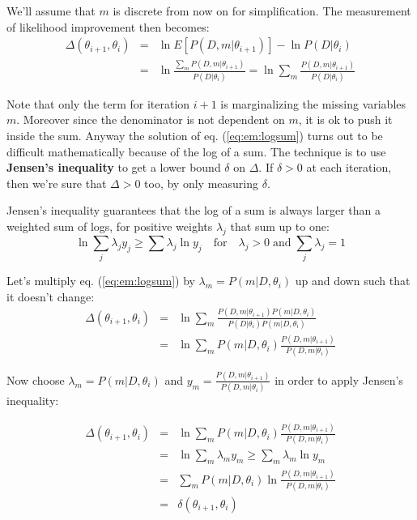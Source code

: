 We'll assume that $m$ is discrete from now on for simplification. 
The measurement of likelihood improvement then becomes:
\begin{eqnarray}
\Delta(\theta_{i+1}, \theta_i) & = &
\ln E[P(D,m|\theta_{i+1})] - \ln P(D|\theta_i) \\ & = &
\ln \frac{\sum_m P(D,m|\theta_{i+1})}{ P(D|\theta_i) } =
\ln \sum_m \frac{P(D,m|\theta_{i+1})}{ P(D|\theta_i) }
\label{eq:em:logsum}
\end{eqnarray}

Note that only the term for iteration $i+1$ is marginalizing the missing variables $m$. Moreover since the denominator is not dependent on $m$, it is ok to push it inside the sum.
Anyway the solution of eq. (\ref{eq:em:logsum}) turns out to be difficult mathematically because of the log of a sum.
%
The technique is to use {\bf Jensen's inequality} to get a lower bound $\delta$ on $\Delta$. %
If $\delta > 0$ at each iteration, then we're sure that $\Delta > 0$ too, by only measuring $\delta$.

Jensen's inequality guarantees that the log of a sum is always larger than a weighted sum of logs, for positive weights $\lambda_j$ that sum up to one:
\begin{equation}
\ln \sum_j \lambda_j y_j \ge \sum \lambda_j \ln y_j 
\quad \text{for} \quad \lambda_j > 0 \; \text{and} \; \sum_j \lambda_j = 1
\end{equation}

Let's multiply eq. (\ref{eq:em:logsum}) by $\lambda_m = P(m|D,\theta_i)$ up and down such that it doesn't change:
\begin{eqnarray}
\Delta(\theta_{i+1}, \theta_i) & = &
\ln \sum_m \frac{P(D,m|\theta_{i+1}) P(m|D,\theta_i)}
                { P(D|\theta_i) P(m|D,\theta_i)}
\\
& = &
\ln \sum_m P(m|D,\theta_i) \frac{P(D,m|\theta_{i+1}) }{ P(D,m|\theta_i)}
\label{eq:em:logsum2}
\end{eqnarray}

Now choose $\lambda_m = P(m|D,\theta_i)$ and $y_m = \frac{P(D,m|\theta_{i+1}) }{ P(D,m|\theta_i)}$ in order to apply Jensen's inequality:

\begin{eqnarray}
\Delta(\theta_{i+1}, \theta_i) & = &
\ln \sum_m P(m|D,\theta_i) \frac{P(D,m|\theta_{i+1}) }{ P(D,m|\theta_i)}
\\
& = &
\ln \sum_m \lambda_m y_m \ge 
\sum_m \lambda_m \ln y_m 
\\
& = &
\sum_m P(m|D,\theta_i) \ln \frac{P(D,m|\theta_{i+1}) }{ P(D,m|\theta_i)}
\\
& = &
\delta(\theta_{i+1}, \theta_i)
\label{eq:em:logsum3}
\end{eqnarray}

